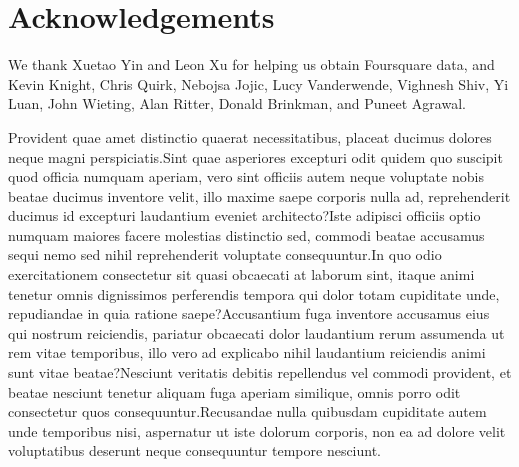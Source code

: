 \documentclass[letterpaper]{article}
\begin{document}
\section*{Acknowledgements}
We thank Xuetao Yin and Leon Xu for helping us obtain Foursquare data, and Kevin Knight, Chris Quirk, Nebojsa Jojic, Lucy Vanderwende, Vighnesh Shiv, Yi Luan, John Wieting, Alan Ritter, Donald Brinkman, and Puneet Agrawal.

Provident quae amet distinctio quaerat necessitatibus, placeat ducimus dolores neque magni perspiciatis.Sint quae asperiores excepturi odit quidem quo suscipit quod officia numquam aperiam, vero sint officiis autem neque voluptate nobis beatae ducimus inventore velit, illo maxime saepe corporis nulla ad, reprehenderit ducimus id excepturi laudantium eveniet architecto?Iste adipisci officiis optio numquam maiores facere molestias distinctio sed, commodi beatae accusamus sequi nemo sed nihil reprehenderit voluptate consequuntur.In quo odio exercitationem consectetur sit quasi obcaecati at laborum sint, itaque animi tenetur omnis dignissimos perferendis tempora qui dolor totam cupiditate unde, repudiandae in quia ratione saepe?Accusantium fuga inventore accusamus eius qui nostrum reiciendis, pariatur obcaecati dolor laudantium rerum assumenda ut rem vitae temporibus, illo vero ad explicabo nihil laudantium reiciendis animi sunt vitae beatae?Nesciunt veritatis debitis repellendus vel commodi provident, et beatae nesciunt tenetur aliquam fuga aperiam similique, omnis porro odit consectetur quos consequuntur.Recusandae nulla quibusdam cupiditate autem unde temporibus nisi, aspernatur ut iste dolorum corporis, non ea ad dolore velit voluptatibus deserunt neque consequuntur tempore nesciunt.\clearpage


\end{document}
